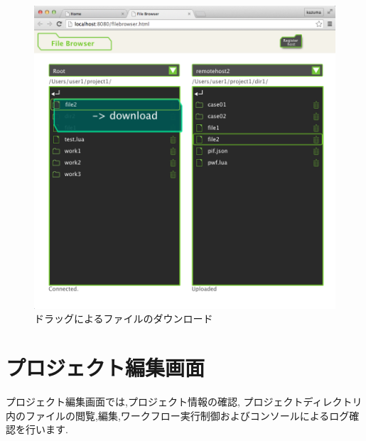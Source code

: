 \documentclass[a4paper,10pt,oneside]{jsbook}
\begin{document}
\begin{figure}[htbp]
	\begin{center}
		\includegraphics[width=12.0cm]{image/filebrowser_010.png}
	\end{center}
	\caption{ドラッグによるファイルのダウンロード}
	\label{fig:filebrowser_filedownload}
\end{figure}

\newpage

\chapter{プロジェクト編集画面}
\label{chap:projeditor}
プロジェクト編集画面では,プロジェクト情報の確認, プロジェクトディレクトリ内のファイルの閲覧,編集,ワークフロー実行制御およびコンソールによるログ確認を行います.
\end{document}
